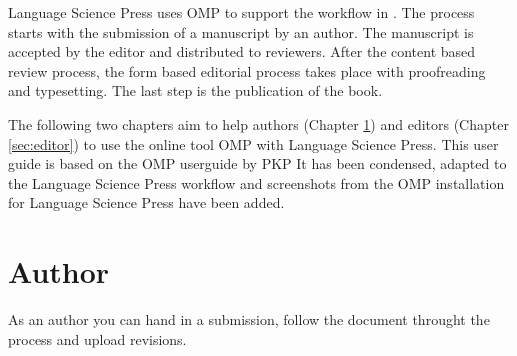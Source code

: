 Language Science Press uses OMP to support the workflow in .
The process starts with the submission of a manuscript by an author. The manuscript is accepted by the editor and distributed to reviewers. After the content based review process, the form based editorial process takes place with proofreading and typesetting. The last step is the publication of the book.  

The following two chapters aim to help authors (Chapter \ref{sec:author}) and editors (Chapter \ref{sec:editor}) to use the online tool OMP with Language Science Press. This user guide is based on the OMP userguide by PKP%
It has been condensed, adapted to the Language Science Press workflow and screenshots from the OMP installation for Language Science Press have been added.






\newpage


\chapter{Author} \label{sec:author}
As an author you can hand in a submission, follow the document throught the process and upload revisions. 


